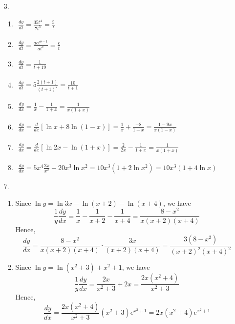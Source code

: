 \documentclass{./../../Latex/homework}
\begin{document}
\begin{enumerate}
\item[3.]  
\begin{enumerate}
\item $\begin{aligned} \frac{d y}{d t}=\frac{35 t^4}{7 t^5}=\frac{5}{t} \end{aligned}$
\item $\begin{aligned}\frac{d y}{d t}=\frac{a c t^{o-1}}{a t^c}=\frac{c}{t}\end{aligned}$
\item $\begin{aligned}\frac{d y}{d t}=\frac{1}{t+19}\end{aligned}$
\item $\begin{aligned}\frac{d y}{d t}=5 \frac{2(t+1)}{(t+1)^2}=\frac{10}{t+1}\end{aligned}$
\item $\begin{aligned}\frac{d y}{d x}=\frac{1}{x}-\frac{1}{1+x}=\frac{1}{x(1+x)}\end{aligned}$
\item $\begin{aligned}\frac{d y}{d x}=\frac{d}{d x}[\ln x+8 \ln (1-x)]=\frac{1}{x}+\frac{-8}{1-x}=\frac{1-9 x}{x(1-x)}\end{aligned}$
\item $\begin{aligned}\frac{d y}{d x}=\frac{d}{d x}[\ln 2 x-\ln (1+x)]=\frac{2}{2 x}-\frac{1}{1+x}=\frac{1}{x(1+x)}\end{aligned}$
\item $\begin{aligned}\frac{d y}{d x}=5 x^4 \frac{2 x}{x^2}+20 x^3 \ln x^2=10 x^3\left(1+2 \ln x^2\right)=10 x^3(1+4 \ln x)\end{aligned}$ \\
\end{enumerate}

\item[7.]  
\begin{enumerate}
\item Since $\ln y=\ln 3 x-\ln (x+2)-\ln (x+4)$, we have 
$$\frac{1}{y} \frac{d y}{d x}=\frac{1}{x}-\frac{1}{x+2}-\frac{1}{x+4}=\frac{8-x^2}{x(x+2)(x+4)}$$ 
Hence,
 $$\frac{d y}{d x}=\frac{8-x^2}{x(x+2)(x+4)} \cdot \frac{3 x}{(x+2)(x+4)}=\frac{3\left(8-x^2\right)}{(x+2)^2(x+4)^2}$$
 
\item Since $\ln y=\ln \left(x^2+3\right)+x^2+1$, we have $$\frac{1}{y} \frac{d y}{d x}=\frac{2 x}{x^2+3}+2 x=\frac{2 x\left(x^2+4\right)}{x^2+3}$$ 
Hence, $$\frac{d y}{d x}=\frac{2 x\left(x^2+4\right)}{x^2+3}\left(x^2+3\right) e^{x^2+1}=2 x\left(x^2+4\right) e^{x^2+1}$$ \\
\end{enumerate}
\end{enumerate}
\end{document}

